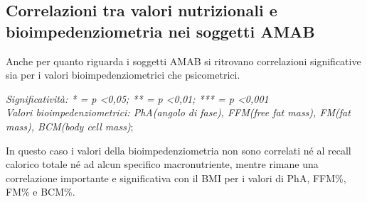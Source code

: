 \documentclass[12pt]{article}
\begin{document}
\subsection{Correlazioni tra valori nutrizionali e bioimpedenziometria nei soggetti AMAB}
\label{sec:org0eba821}
Anche per quanto riguarda i soggetti AMAB si ritrovano correlazioni significative sia per i valori bioimpedenziometrici che psicometrici.


\begin{table}[H]
    \centering
    \caption{Correlazioni tra valori nutrizionali e BIA nei pazienti AMAB}
    \vspace*{0.2em}
{\renewcommand{\arraystretch}{2}%
}
    \label{tab:my_label}
    \footnotesize \textit{Significatività: * = p <0,05; ** = p <0,01; *** = p <0,001 \\ Valori bioimpedenziometrici: PhA(angolo di fase), FFM(free fat mass), FM(fat mass), BCM(body cell mass)};
\end{table}

In questo caso i valori della bioimpedenziometria non sono correlati né al recall calorico totale né ad alcun specifico macronutriente, mentre rimane una correlazione importante e significativa con il BMI per i valori di PhA, FFM\%, FM\% e BCM\%.
\end{document}
